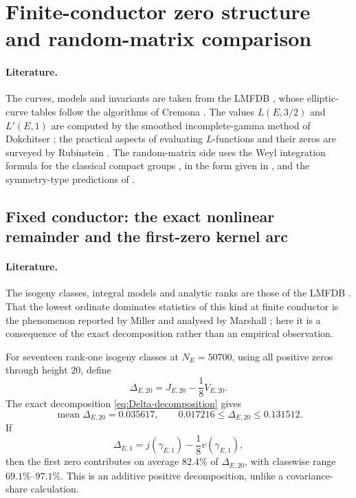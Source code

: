 \documentclass[11pt,reqno]{amsart}
\theoremstyle{remark}
\begin{document}
\section{Finite-conductor zero structure and random-matrix comparison}
\label{sec:numerics}

\paragraph{Literature.}
The curves, models and invariants are taken from the LMFDB \cite{LMFDB}, whose elliptic-curve tables follow the algorithms of Cremona \cite{Cremona1997}.  The values $L(E,3/2)$ and $L'(E,1)$ are computed by the smoothed incomplete-gamma method of Dokchitser \cite{Dokchitser2004}; the practical aspects of evaluating $L$-functions and their zeros are surveyed by Rubinstein \cite{RubinsteinLNS2005}.  The random-matrix side uses the Weyl integration formula for the classical compact groups \cite{Weyl1939}, in the form given in \cite{Mehta2004,Forrester2010}, and the symmetry-type predictions of \cite{KatzSarnak1999,KatzSarnak1999BAMS}.

\subsection{Fixed conductor: the exact nonlinear remainder and the first-zero kernel arc}

\paragraph{Literature.}
The isogeny classes, integral models and analytic ranks are those of the LMFDB \cite{LMFDB}.  That the lowest ordinate dominates statistics of this kind at finite conductor is the phenomenon reported by Miller \cite{Miller2006} and analysed by Marshall \cite{Marshall2013}; here it is a consequence of the exact decomposition rather than an empirical observation.

For seventeen rank-one isogeny classes at $N_E=50700$, using all positive zeros through height $20$, define
\begin{equation}
  \Delta_{E,20}=J_{E,20}-\frac18V_{E,20}.
\end{equation}
The exact decomposition \eqref{eq:Delta-decomposition} gives
\begin{equation}
  \operatorname{mean}\Delta_{E,20}=0.035617,
  \qquad
  0.017216\le\Delta_{E,20}\le0.131512.
  \label{eq:Delta-50700-range}
\end{equation}
If
\begin{equation}
  \Delta_{E,1}=j(\gamma_{E,1})-\frac18v(\gamma_{E,1}),
\end{equation}
then the first zero contributes on average $82.4\%$ of $\Delta_{E,20}$, with classwise range $69.1\%$--$97.1\%$.  This is an additive positive decomposition, unlike a covariance-share calculation.
\end{document}

